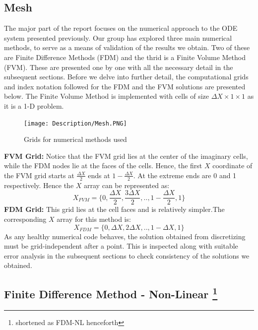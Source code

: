 \documentclass[12pt]{article}
\begin{document}
\subsection{Mesh}
The major part of the report focuses on the numerical approach to the ODE system presented previously. Our group has explored three main numerical methods, to serve as a means of validation of the results we obtain. Two of these are Finite Difference Methods (FDM) and the thrid is a Finite Volume Method (FVM). These are presented one by one with all the necessary detail in the subsequent sections. Before we delve into further detail, the computational grids and index notation followed for the FDM and the FVM solutions are presented below. The Finite Volume Method is implemented with cells of size $\Delta X \times 1 \times 1$ as it is a 1-D problem. 
\begin{figure}[H]
    \centering
    \texttt{[image: Description/Mesh.PNG]}
    \caption{Grids for numerical methods used}
    \label{fig:10}
\end{figure}
\textbf{FVM Grid: }Notice that the FVM grid lies at the center of the imaginary cells, while the FDM nodes lie at the faces of the cells. Hence, the first $X$ coordinate of the FVM grid starts at $\frac{\Delta X}{2}$ ends at $1-\frac{\Delta X}{2}$. At the extreme ends are 0 and 1 respectively. Hence the $X$ array can be represented as: 
\[
X_{FVM} = \{0, \frac{\Delta X}{2}, \frac{3 \Delta X}{2}, .., 1-\frac{\Delta X}{2},1\}
\]
\textbf{FDM Grid: }This grid lies at the cell faces and is relatively simpler.The corresponding $X$ array for this method is:
\[
X_{FDM} = \{0, \Delta X, 2\Delta X,..,1-\Delta X, 1\}
\]
As any healthy numerical code behaves, the solution obtained from discretizing must be grid-independent after a point. This is inspected along with suitable error analysis in the subsequent sections to check consistency of the solutions we obtained. 
\subsection{Finite Difference Method - Non-Linear \footnote{shortened as FDM-NL henceforth}}
\end{document}
